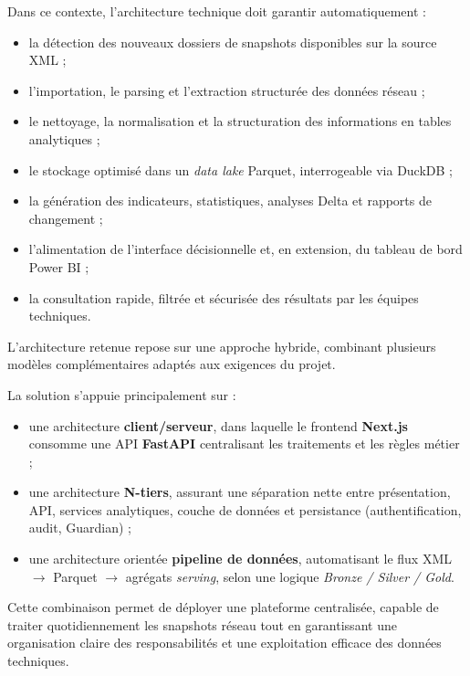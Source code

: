 \documentclass[12pt,a4paper]{report}
\begin{document}
\begin{flushleft}
Dans ce contexte, l'architecture technique doit garantir automatiquement :

\begin{itemize}
    \item la détection des nouveaux dossiers de snapshots disponibles sur la source XML ;
    \item l'importation, le parsing et l'extraction structurée des données réseau ;
    \item le nettoyage, la normalisation et la structuration des informations en tables analytiques ;
    \item le stockage optimisé dans un \textit{data lake} Parquet, interrogeable via DuckDB ;
    \item la génération des indicateurs, statistiques, analyses Delta et rapports de changement ;
    \item l'alimentation de l'interface décisionnelle et, en extension, du tableau de bord Power BI ;
    \item la consultation rapide, filtrée et sécurisée des résultats par les équipes techniques.
\end{itemize}

L'architecture retenue repose sur une approche hybride, combinant plusieurs modèles complémentaires adaptés aux exigences du projet.

\vspace{0.3cm}

La solution s'appuie principalement sur :

\begin{itemize}
    \item une architecture \textbf{client/serveur}, dans laquelle le frontend \textbf{Next.js} consomme une API \textbf{FastAPI} centralisant les traitements et les règles métier ;
    \item une architecture \textbf{N-tiers}, assurant une séparation nette entre présentation, API, services analytiques, couche de données et persistance (authentification, audit, Guardian) ;
    \item une architecture orientée \textbf{pipeline de données}, automatisant le flux XML $\rightarrow$ Parquet $\rightarrow$ agrégats \textit{serving}, selon une logique \textit{Bronze / Silver / Gold}.
\end{itemize}

Cette combinaison permet de déployer une plateforme centralisée, capable de traiter quotidiennement les snapshots réseau tout en garantissant une organisation claire des responsabilités et une exploitation efficace des données techniques.


\end{flushleft}
\end{document}
